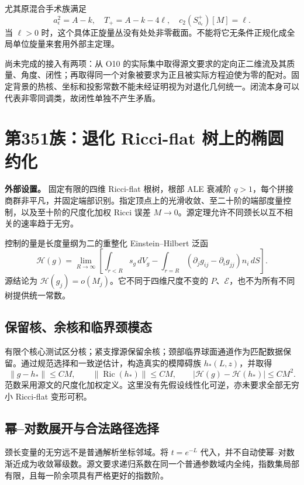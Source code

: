 \documentclass[UTF8,11pt,openany,fontset=none]{ctexbook}
\theoremstyle{definition}
\theoremstyle{remark}
\begin{document}
尤其原混合手术族满足 \[
 a_\epsilon^2=A-k,\quad T_+=A-k-4\ell,\quad
 c_2(S^+_{a_\epsilon})[M]=\ell.
\tag{2.5}
\] 当 \(\ell>0\) 时，这个具体正旋量丛没有处处非零截面。不能将它无条件正规化成全局单位旋量来套用外部主定理。

尚未完成的接入有两项：从 O10 的实际集中取得源文要求的定向正二维流及其质量、角度、闭性；再取得同一个对象被要求为正且被实际方程迫使为零的配对。固定背景的热核、坐标和投影常数不能未经证明视为对退化几何统一。闭流本身可以代表非零同调类，故闭性单独不产生矛盾。\cite{R01,R02}

\section{第351族：退化 Ricci-flat 树上的椭圆约化}\label{v2-ux7b2c351ux65cfux9000ux5316-ricci-flat-ux6811ux4e0aux7684ux692dux5706ux7ea6ux5316}

\textbf{外部设置。} 固定有限的四维 Ricci-flat 根树，根部 ALE 衰减阶 \(q>1\)，每个拼接商群非平凡，并固定端部识别。指定顶点上的光滑收敛、至二十阶的端部度量控制，以及至十阶的尺度化加权 Ricci 误差 \(M\to0\)。源定理允许不同颈长以互不相关的速率趋于无穷。\cite{OAI351Tree}

控制的量是长度量纲为二的重整化 Einstein--Hilbert 泛函 \[
 \mathscr H(g)=\lim_{R\to\infty}
 \left[\int_{r<R}s_g\,dV_g-
 \int_{r=R}(\partial_jg_{ij}-\partial_ig_{jj})n_i\,dS\right].
\] 源结论为 \(\mathscr H(g_j)=o(M_j)\)。它不同于四维尺度不变的 \(P\)、\(\mathcal E\)，也不为所有不同树提供统一常数。

\subsection{保留核、余核和临界颈模态}\label{v2-ux4fddux7559ux6838ux4f59ux6838ux548cux4e34ux754cux9888ux6a21ux6001}

有限个核心测试区分核；紧支撑源保留余核；颈部临界球面通道作为匹配数据保留。通过规范选择和一致逆估计，构造真实的模障碍族 \(h_*(L,z)\)，并取得 \[
 \|g-h_*\|\le CM,\qquad
 \|\operatorname{Ric}(h_*)\|\le CM,\qquad
 |\mathscr H(g)-\mathscr H(h_*)|\le CM^2.
\tag{2.6}
\] 范数采用源文的尺度化加权定义。这里没有先假设线性化可逆，亦未要求全部无穷小 Ricci-flat 变形可积。

\subsection{幂--对数展开与合法路径选择}\label{v2-ux5e42ux5bf9ux6570ux5c55ux5f00ux4e0eux5408ux6cd5ux8defux5f84ux9009ux62e9}

颈长变量的无穷远不是普通解析坐标邻域。将 \(t=e^{-L}\) 代入，并不自动使幂--对数渐近成为收敛幂级数。源文要求递归系数在同一个普通参数域内全纯，指数集局部有限，且每一阶余项具有严格更好的指数阶。
\end{document}
